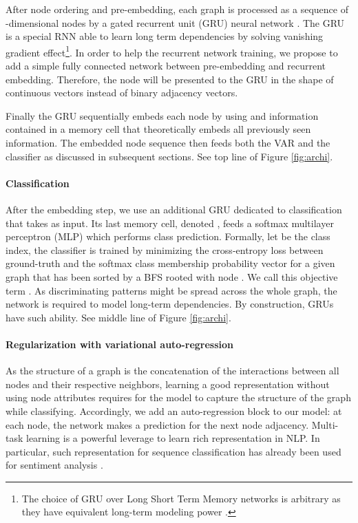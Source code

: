 \documentclass{article} \usepackage{iclr2019_conference}
\begin{document}
After node ordering and pre-embedding, each graph is processed as a sequence of -dimensional nodes by a gated recurrent unit (GRU) neural network \citep{cho2014learning}. The GRU is a special RNN able to learn long term dependencies by solving vanishing gradient effect\footnote{The choice of GRU over Long Short Term Memory networks is arbitrary as they have equivalent long-term modeling power \citep{chung2014empirical}.}. In order to help the recurrent network training, we propose to add a simple fully connected network between pre-embedding and recurrent embedding. Therefore, the node will be presented to the GRU in the shape of continuous vectors instead of binary adjacency vectors. 

Finally the GRU sequentially embeds each node  by using  and information contained in a memory cell  that theoretically embeds all previously seen information. The embedded node sequence  then feeds both the VAR and the classifier as discussed in subsequent sections. See top line of Figure \ref{fig:archi}.

\paragraph{Classification}
\label{subsec:classification}

After the embedding step, we use an additional GRU dedicated to classification that takes  as input.
Its last memory cell, denoted , feeds a softmax multilayer perceptron (MLP) which performs class prediction.
Formally, let  be the class index, the classifier is trained by minimizing the cross-entropy loss between ground-truth and  the softmax class membership probability vector for a given graph  that has been sorted by a BFS rooted with node . We call this objective term .
As discriminating patterns might be spread across the whole graph, the network is required to model long-term dependencies. By construction, GRUs have such ability. See middle line of Figure \ref{fig:archi}.

\paragraph{Regularization with variational auto-regression}
\label{subsec:vap}

As the structure of a graph is the concatenation of the interactions between all nodes and their respective neighbors, learning a good representation without using node attributes requires for the model to capture the structure of the graph while classifying. Accordingly, we add an auto-regression block to our model: at each node, the network makes a prediction for the next node adjacency. Multi-task learning is a powerful leverage to learn rich representation \citep{sanh2018hierarchical} in NLP. In particular, such representation for sequence classification has already been used for sentiment analysis \citep{latif2017variational, xu2017variational}. 
\end{document}
